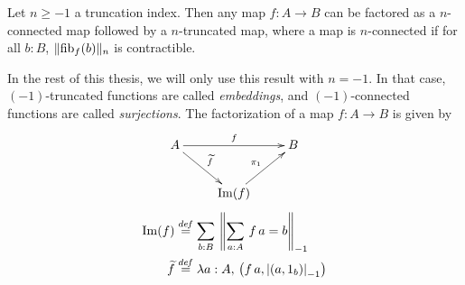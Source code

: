 \begin{prop}
  Let $n\geqslant -1$ a truncation index. Then any map $f:A\to B$ can
  be factored as a $n$-connected map followed by a $n$-truncated map,
  where a map is $n$-connected if for all $b:B$, $\|\mathrm{fib}_{f}(b)\|_n$ is contractible.
\end{prop}

In the rest of this thesis, we will only use this result with
$n=-1$. In that case, $(-1)$-truncated functions are called {\em
  embeddings}, and $(-1)$-connected functions are called {\em
  surjections}. The factorization of a map $f:A\to B$ is given by
\[
  \xymatrix{
    A \ar[rr]^f \ar[rd]^{\widetilde f} && B \\
    & \im(f)  \ar[ru]^{\pi_1} &
  }
\]
\begin{align*}
  \operatorname{Im}(f) &\overset{de\hspace{-0.2ex}f}{=} \sum_{b:B}\, \left\| \sum_{a:A}\, f\, a = b
  \right\|_{-1} \\
  \widetilde f &\overset{de\hspace{-0.2ex}f}{=} \lambda a:A,\, \left(f\, a,\left|(a,1_b)\right|_{-1}\right)
\end{align*}

